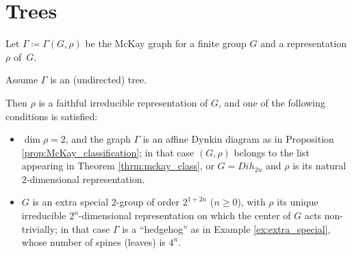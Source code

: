 \documentclass[ALCO]{cedram}
\begin{document}
\section{Trees}\label{sec:trees}
\begin{theorem}\label{thrm:main}
 Let $\Gamma \coloneqq  \Gamma(G, \rho)$ be the McKay graph for a finite group $G$ and a representation $\rho$ of~$G$. 
 
 Assume $\Gamma$ is an (undirected) tree. 
 
 Then $\rho$ is a faithful irreducible representation of $G$, and one of the following conditions is satisfied:
 \begin{itemize}
 \item $\dim \rho =2$, and the graph $\Gamma$ is an affine Dynkin diagram as in Proposition \ref{prop:McKay_classification}; in that case $(G, \rho)$ belongs to the list appearing in Theorem \ref{thrm:mckay_class}, or $G=Dih_{2n}$ and $\rho$ is its natural $2$-dimensional representation.
  \item $G$ is an extra special $2$-group of order  $2^{1+2n}$ ($n\geq 0$), with $\rho$ its unique irreducible $2^n$-dimensional representation on which the center of $G$ acts non-trivially; in that case $\Gamma$ is a ``hedgehog'' as in Example \ref{ex:extra_special}, whose number of spines (leaves) is $4^n$. 
 \end{itemize}

\end{theorem}
\end{document}
